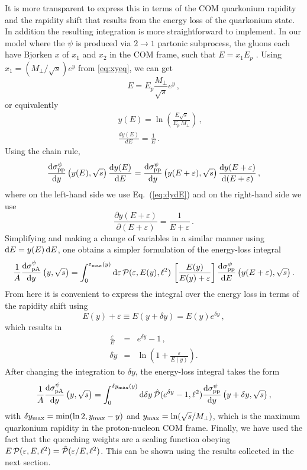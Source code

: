 \documentclass[11pt,onecolumn]{article}
\newcommand{\dd}{{\rm d}}
\newcommand{\beq}{\begin{equation}}
\newcommand{\eeq}{\end{equation}}
\newcommand{\bqa}{\begin{eqnarray}}
\newcommand{\eqa}{\end{eqnarray}}
\begin{document}
It is more transparent to express this in terms of the COM quarkonium rapidity and the rapidity shift that results from the energy loss of the quarkonium state.  In addition the resulting integration is more straightforward to implement. In our model where the $\psi$ is produced via $ 2 \rightarrow 1$ partonic subprocess, the gluons each have Bjorken $x$ of $x_1$ and $x_2$ in the COM frame, such that $E = x_1 E_p$ \cite{Arleo:2012rs}. Using $ x_1 = (M_\perp/\sqrt{s}) e^y$ from \eqref{eq:xyeq}, we can get
%
\beq
E = E_p \frac{M_\perp}{\sqrt{s}} e^y \, ,  
\eeq
%
or equivalently
%
\bqa
&& y(E) = \ln\left( \frac{E \sqrt{s}}{E_p \, M_\perp} \right) \, , \nonumber \\
&& \frac{dy(E)}{dE} = \frac{1}{E} \, .
\label{eq:dydE}
\eqa
%
Using the chain rule, 
%
\beq
\frac{\dd\sigma_{\mathrm{pp}}^{\psi}}{\dd y} \left( y(E), \sqrt{s}\right) \frac{\dd y(E) }{\dd E}  = \frac{\dd\sigma_{\mathrm{pp}}^{\psi}}{\dd y} \left( y(E+\varepsilon), \sqrt{s}\right) \frac{\dd y(E+\varepsilon) }{\dd (E + \varepsilon)} \, ,
\eeq
%
where on the left-hand side we use Eq.~(\eqref{eq:dydE}) and on the right-hand side we use
%
\beq
\frac{\partial y(E+\varepsilon)}{\partial (E+\varepsilon)} = \frac{1}{E+\varepsilon} \, .
\eeq
%
Simplifying and making a change of variables in a similar manner using $ \dd E = y(E) \, \dd E$,
%
one obtains a simpler formulation of the energy-loss integral \cite{Arleo:2013zua}
%
\beq
\frac{1}{A}\frac{\dd\sigma_{\mathrm{pA}}^{\psi}}{\dd y}\left(y, \sqrt{s} \right)  = \int_0^{\varepsilon_{\rm max}(y)} \dd \varepsilon \,{\cal P}(\varepsilon, E(y), \ell^2) \, \left[ \frac{E(y)}{E(y)+\varepsilon} \right] \frac{\dd\sigma_{\mathrm{pp}}^{\psi}}{\dd E} \left( y(E+\varepsilon), \sqrt{s}\right) .
\label{eq:dcs_y}
\eeq
%
From here it is convenient to express the integral over the energy loss in terms of the rapidity shift using
%
\beq
E(y) + \varepsilon \equiv E(y + \delta y) = E(y) e^{\delta y} \, ,
\eeq
%
which results in
%
\bqa
\frac{\varepsilon}{E} &=& e^{\delta y} - 1 \, , \nonumber \\
\delta y &=& \ln\left(1 + \frac{\varepsilon}{E(y)} \right) .
\label{eq:elossratio}
\eqa
%
After changing the integration to $\delta y$, the energy-loss integral takes the form
%
\beq
\frac{1}{A}\frac{\dd\sigma_{\mathrm{pA}}^{\psi}}{\dd y}\left(y, \sqrt{s} \right)  = \int_0^{\delta y_{\rm max}(y)} \dd \delta y \,\hat{\cal P}(e^{\delta y} - 1, \ell^2) \frac{\dd\sigma_{\mathrm{pp}}^{\psi}}{\dd y} \left( y + \delta y, \sqrt{s}\right) ,
\eeq
%
with $\delta y_{\rm max} = {\rm min}(\ln 2,y_{\rm max}-y)$ and $y_{\rm max} = \ln(\sqrt{s}/M_\perp)$, which is the maximum quarkonium rapidity in the proton-nucleon COM frame.  Finally, we have used the fact that the quenching weights are a scaling function obeying $E \, {\cal P}(\varepsilon,E, \ell^2) = \hat{\cal P}(\varepsilon/E, \ell^2)$.  This can be shown using the results collected in the next section.
\end{document}
